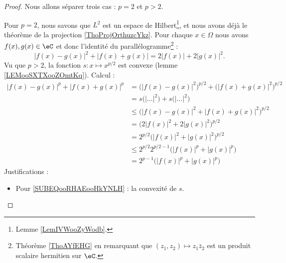\begin{proof}
    Nous allons séparer trois cas : \( p=2\) et \( p>2\).
    \begin{subproof}
        \spitem[\( p=2\)]
        Pour \( p=2\), nous savons que \( L^2\) est un espace de Hilbert\footnote{Lemme \ref{LemIVWooZyWodb}.}, et nous avons déjà le théorème de la projection \ref{ThoProjOrthuzcYkz}.
        \spitem[\( p>2\)]
        Pour chaque \( x\in \Omega\) nous avons \( f(x), g(x)\in \eC\) et donc l'identité du parallélogramme\footnote{Théorème \ref{ThoAYfEHG} en remarquant que \( (z_1,z_2)\mapsto z_1\bar z_2\) est un produit scalaire hermitien sur \( \eC\).} :
        \begin{equation}        \label{EQooUBFEooDUjLnb}
            \big| f(x)-g(x) \big|^2+\big| f(x)+g(x) \big|=2| f(x) |+2| g(x) |^2.
        \end{equation}
        Vu que \( p>2\), la fonction \( s\colon x\mapsto  x^{p/2}\) est convexe (lemme \ref{LEMooSXTXooZOmtKq}). Calcul :
        \begin{subequations}
            \begin{align}
                | f(x)-g(x) |^p+| f(x)+g(x) |^p & =\big( | f(x)-g(x) |^2 \big)^{p/2}+\big( | f(x)+g(x) |^2 \big)^{p/2}                    \\
                                                & =s\big( | \ldots |^2 \big)+s\big( | \ldots |^2 \big)                                    \\
                                                & \leq \big( | f(x)-g(x) |^2+| f(x)+g(x) |^2 \big)^{p/2}     \label{SUBEQooRHAEooHkYNLH}  \\
                                                & =\big( 2| f(x) |^2+2| g(x) |^2 \big)^{p/2}                 \label{SUBEQooQFSLooJkoeqN}  \\
                                                & =2^{p/2}\big( | f(x) |^2+| g(x) |^2 \big)^{p/2}                                         \\
                                                & \leq  2^{p/2}2^{p/2-1}\big( | f(x) |^p+| g(x) |^p \big)     \label{SUBEQooQSUHooXKaWwO} \\
                                                & =2^{p-1}\big( | f(x) |^p+| g(x) |^p \big)
            \end{align}
        \end{subequations}
        Justifications :
        \begin{itemize}
            \item Pour \eqref{SUBEQooRHAEooHkYNLH} : la convexité de \( s\).

\end{itemize}
\end{subproof}
\end{proof}
